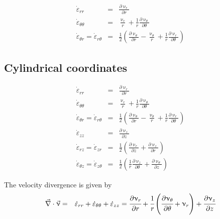 \begin{eqnarray}
\dot\varepsilon_{rr} 
&=& \frac{\partial \upnu_r}{\partial r} \\
\dot\varepsilon_{\theta\theta} 
&=& \frac{\upnu_r}{r} + \frac{1}{r} \frac{\partial \upnu_\theta}{\partial \theta}  \\
\dot\varepsilon_{\theta r} = \dot\varepsilon_{r\theta} 
&=& \frac{1}{2} \left(   \frac{\partial \upnu_\theta}{\partial r} - \frac{\upnu_\theta}{r} 
+\frac{1}{r} \frac{\partial \upnu_r}{\partial \theta}  \right) 
\end{eqnarray}



\subsection{Cylindrical coordinates \label{ss:srcc}}

\begin{eqnarray}
\dot\varepsilon_{rr} 
&=& \frac{\partial \upnu_r}{\partial r} 
\\
\dot\varepsilon_{\theta\theta} 
&=& \frac{\upnu_r}{r} + \frac{1}{r} \frac{\partial \upnu_\theta}{\partial \theta}  
\\
\dot\varepsilon_{\theta r} = \dot\varepsilon_{r\theta} 
&=& \frac{1}{2} \left(   \frac{\partial \upnu_\theta}{\partial r} - \frac{\upnu_\theta}{r} 
+\frac{1}{r} \frac{\partial \upnu_r}{\partial \theta}  \right)
\\
\dot\varepsilon_{zz} 
&=& \frac{\partial \upnu_z}{\partial z} 
\\
\dot{\varepsilon}_{rz} = \dot{\varepsilon}_{zr} 
&=& \frac{1}{2}\left( \frac{\partial \upnu_r}{\partial z} + \frac{\partial \upnu_z}{\partial r}  \right) 
\\
\dot{\varepsilon}_{\theta z} = \dot{\varepsilon}_{z \theta} &=& \frac{1}{2}\left( 
\frac{1}{r} \frac{\partial \upnu_z}{\partial \theta} + \frac{\partial \upnu_\theta}{\partial z}  \right) 
\end{eqnarray}


The velocity divergence is given by
\begin{eqnarray}
\vec{\nabla}\cdot\vec\upnu 
&=& \dot{\varepsilon}_{rr} + \dot{\varepsilon}_{\theta\theta} + \dot{\varepsilon}_{zz} 
 = \cfrac{\partial \upnu_r}{\partial r} + \cfrac{1}{r}\left(\cfrac{\partial \upnu_\theta}{\partial \theta} 
+ \upnu_r \right)  + \cfrac{\partial \upnu_z}{\partial z}
\end{eqnarray} 


